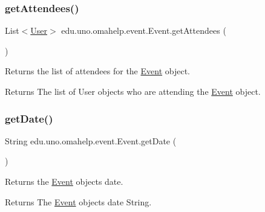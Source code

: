 \subsubsection{\texorpdfstring{get\+Attendees()}{getAttendees()}}
{\footnotesize\ttfamily List$<$\mbox{\hyperlink{classedu_1_1uno_1_1omahelp_1_1user_1_1_user}{User}}$>$ edu.\+uno.\+omahelp.\+event.\+Event.\+get\+Attendees (\begin{DoxyParamCaption}{ }\end{DoxyParamCaption})}

Returns the list of attendees for the \mbox{\hyperlink{classedu_1_1uno_1_1omahelp_1_1event_1_1_event}{Event}} object.

\begin{DoxyReturn}{Returns}
The list of User objects who are attending the \mbox{\hyperlink{classedu_1_1uno_1_1omahelp_1_1event_1_1_event}{Event}} object. 
\end{DoxyReturn}
\mbox{\label{classedu_1_1uno_1_1omahelp_1_1event_1_1_event_ad878c65e3b52872b7dd07b79206ddfca}} 
\subsubsection{\texorpdfstring{get\+Date()}{getDate()}}
{\footnotesize\ttfamily String edu.\+uno.\+omahelp.\+event.\+Event.\+get\+Date (\begin{DoxyParamCaption}{ }\end{DoxyParamCaption})}

Returns the \mbox{\hyperlink{classedu_1_1uno_1_1omahelp_1_1event_1_1_event}{Event}} object\textquotesingle{}s date.

\begin{DoxyReturn}{Returns}
The \mbox{\hyperlink{classedu_1_1uno_1_1omahelp_1_1event_1_1_event}{Event}} object\textquotesingle{}s date String. 
\end{DoxyReturn}
\mbox{\label{classedu_1_1uno_1_1omahelp_1_1event_1_1_event_a46c86b7f22f97ada82fb3269df3a7315}} 
